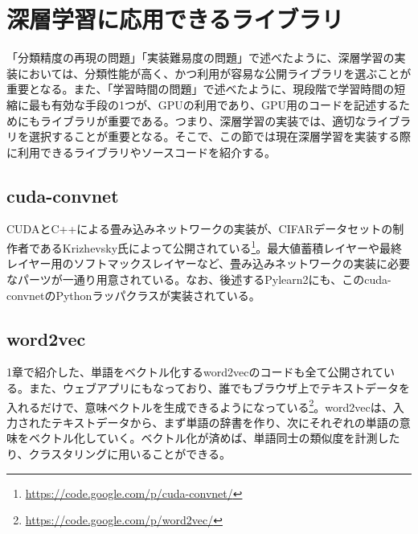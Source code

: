 \section{深層学習に応用できるライブラリ}
「分類精度の再現の問題」「実装難易度の問題」で述べたように、深層学習の実装においては、分類性能が高く、かつ利用が容易な公開ライブラリを選ぶことが重要となる。また、「学習時間の問題」で述べたように、現段階で学習時間の短縮に最も有効な手段の1つが、GPUの利用であり、GPU用のコードを記述するためにもライブラリが重要である。つまり、深層学習の実装では、適切なライブラリを選択することが重要となる。そこで、この節では現在深層学習を実装する際に利用できるライブラリやソースコードを紹介する。

\subsection{cuda-convnet}
CUDAとC++による畳み込みネットワークの実装が、CIFARデータセットの制作者であるKrizhevsky氏によって公開されている\footnote{\url{https://code.google.com/p/cuda-convnet/}}。最大値蓄積レイヤーや最終レイヤー用のソフトマックスレイヤーなど、畳み込みネットワークの実装に必要なパーツが一通り用意されている。なお、後述するPylearn2にも、このcuda-convnetのPythonラッパクラスが実装されている。

\subsection{word2vec}
1章で紹介した、単語をベクトル化するword2vecのコードも全て公開されている。また、ウェブアプリにもなっており、誰でもブラウザ上でテキストデータを入れるだけで、意味ベクトルを生成できるようになっている\footnote{\url{https://code.google.com/p/word2vec/}}。word2vecは、入力されたテキストデータから、まず単語の辞書を作り、次にそれぞれの単語の意味をベクトル化していく。ベクトル化が済めば、単語同士の類似度を計測したり、クラスタリングに用いることができる。


